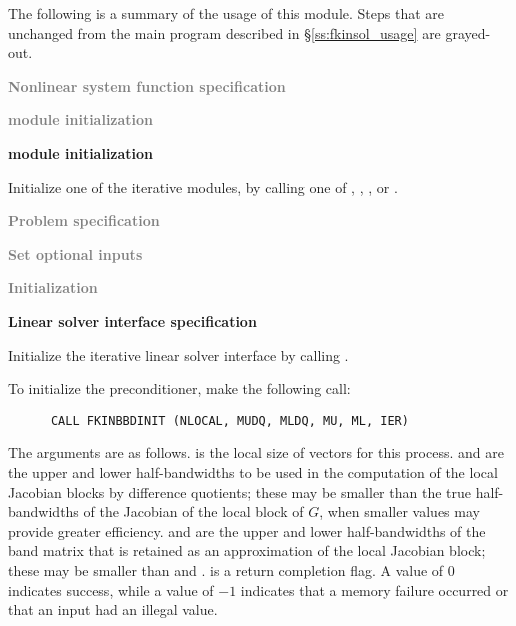 The following is a summary of the usage of this module. Steps that are unchanged
from the main program described in \S\ref{ss:fkinsol_usage} are grayed-out.

\begin{Steps}
  
\item \textcolor{gray}{\bf Nonlinear system function specification}

\item \textcolor{gray}{\bf {\nvector} module initialization}

\item {\bf {\sunlinsol} module initialization}

  Initialize one of the iterative {\sunlinsol} modules, by calling one
  of , , ,
   or .

\item \textcolor{gray}{\bf Problem specification}

\item \textcolor{gray}{\bf Set optional inputs}

\item \textcolor{gray}{\bf {\kinsol} Initialization}

\item {\bf Linear solver interface specification}

  Initialize the {\kinspils} iterative linear solver interface
  by calling .

  To initialize the {\kinbbdpre} preconditioner, make the following call:
\begin{verbatim}
      CALL FKINBBDINIT (NLOCAL, MUDQ, MLDQ, MU, ML, IER)
\end{verbatim}
  The arguments are as follows.
   is the local size of vectors for this process.
   and  are the upper and lower half-bandwidths to be used
  in the computation of the local Jacobian blocks by difference quotients;
  these may be smaller than the true half-bandwidths of the Jacobian of the
  local block of $G$, when smaller values may provide greater efficiency.
   and  are the upper and lower half-bandwidths of the band
  matrix that is retained as an approximation of the local Jacobian block;
  these may be smaller than  and .
   is a return completion flag.  A value of $0$ indicates success, while
  a value of $-1$ indicates that a memory failure occurred or that an input had
  an illegal value.


\end{Steps}
